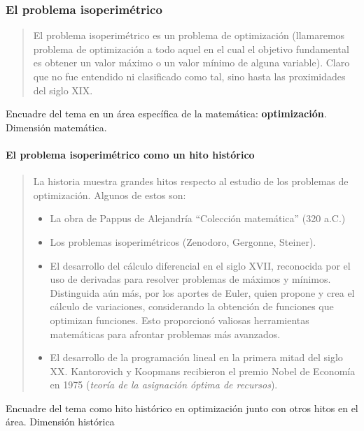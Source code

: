 \subsubsection{El problema isoperimétrico}

\begin{quote}
	El problema isoperimétrico es un problema de optimización (llamaremos problema de optimización a todo aquel en el cual el objetivo fundamental es obtener un valor máximo o un valor mínimo de alguna variable). Claro que no fue entendido ni clasificado como tal, sino hasta las proximidades del siglo XIX.
\end{quote}
\vspace{1em}

Encuadre del tema en un área específica de la matemática: \textbf{optimización}. Dimensión matemática.

\paragraph{El problema isoperimétrico como un hito histórico}

\begin{quote}
	La historia muestra grandes hitos respecto al estudio de los problemas de optimización. Algunos de estos son:
	\begin{itemize}
		\item La obra de Pappus de Alejandría “Colección matemática” (320 a.C.) 
		\item Los problemas isoperimétricos (Zenodoro, Gergonne, Steiner).
		\item El desarrollo del cálculo diferencial en el siglo XVII, reconocida por el uso de derivadas para resolver problemas de máximos y mínimos. Distinguida aún más, por los aportes de Euler, quien propone y crea el cálculo de variaciones, considerando la obtención de funciones que optimizan funciones. Esto proporcionó valiosas herramientas matemáticas para afrontar problemas más avanzados.
		\item El desarrollo de la programación lineal en la primera mitad del siglo XX. Kantorovich y Koopmans recibieron el premio Nobel de Economía en 1975 (\textit{teoría de la asignación óptima de recursos}).
	\end{itemize}
\end{quote}
\vspace{1em}

Encuadre del tema como hito histórico en optimización junto con otros hitos en el área. Dimensión histórica

